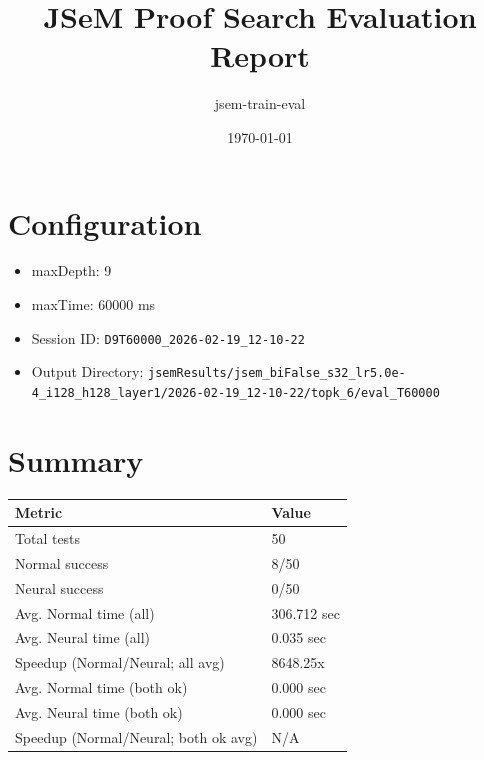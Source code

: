 \documentclass[a4paper,10pt]{article}
\title{JSeM Proof Search Evaluation Report}
\author{jsem-train-eval}
\date{\today}
\begin{document}
\maketitle

\section{Configuration}
\begin{itemize}
\item maxDepth: 9
\item maxTime: 60000 ms
\item Session ID: \texttt{D9T60000\_2026-02-19\_12-10-22}
\item Output Directory: \texttt{jsemResults/jsem\_biFalse\_s32\_lr5.0e-4\_i128\_h128\_layer1/2026-02-19\_12-10-22/topk\_6/eval\_T60000}
\end{itemize}

\section{Summary}
\begin{tabular}{ll}
\toprule
\textbf{Metric} & \textbf{Value} \\
\midrule
Total tests & 50 \\
Normal success & 8/50 \\
Neural success & 0/50 \\
\midrule
Avg. Normal time (all) & 306.712 sec \\
Avg. Neural time (all) & 0.035 sec \\
Speedup (Normal/Neural; all avg) & 8648.25x \\
Avg. Normal time (both ok) & 0.000 sec \\
Avg. Neural time (both ok) & 0.000 sec \\
Speedup (Normal/Neural; both ok avg) & N/A \\
\bottomrule
\end{tabular}
\end{document}
